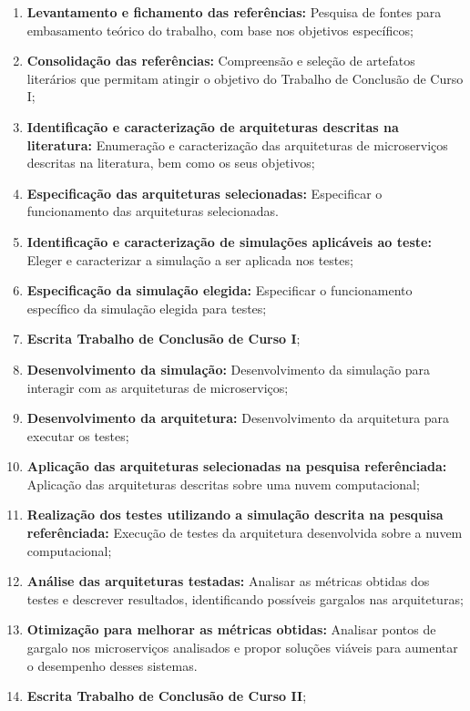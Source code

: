 \begin{enumerate}
  \item \textbf{Levantamento e fichamento das referências:} Pesquisa de fontes para embasamento teórico do trabalho, com base nos objetivos específicos;

  \item \textbf{Consolidação das referências:} Compreensão e seleção de artefatos literários que permitam atingir o objetivo do Trabalho de Conclusão de Curso I;

  \item \textbf{Identificação e caracterização de arquiteturas descritas na literatura:} Enumeração e caracterização das arquiteturas de microserviços descritas na literatura, bem como os seus objetivos;

  \item \textbf{Especificação das arquiteturas selecionadas:} Especificar o funcionamento das arquiteturas selecionadas.

  \item \textbf{Identificação e caracterização de simulações aplicáveis ao teste:} Eleger e caracterizar a simulação a ser aplicada nos testes;

  \item \textbf{Especificação da simulação elegida:} Especificar o funcionamento específico da simulação elegida para testes;

  \item \textbf{Escrita Trabalho de Conclusão de Curso I};

  \item \textbf{Desenvolvimento da simulação:} Desenvolvimento da simulação para interagir com as arquiteturas de microserviços;

  \item \textbf{Desenvolvimento da arquitetura:} Desenvolvimento da arquitetura para executar os testes;

  \item \textbf{Aplicação das arquiteturas selecionadas na pesquisa referênciada:} Aplicação das arquiteturas descritas sobre uma nuvem computacional;

  \item \textbf{Realização dos testes utilizando a simulação descrita na pesquisa referênciada:} Execução de testes da arquitetura desenvolvida sobre a nuvem computacional;

  \item \textbf{Análise das arquiteturas testadas:} Analisar as métricas obtidas dos testes e descrever resultados, identificando possíveis gargalos nas arquiteturas;

  \item \textbf{Otimização para melhorar as métricas obtidas:} Analisar pontos de gargalo nos microserviços analisados e propor soluções viáveis para aumentar o desempenho desses sistemas.

  \item \textbf{Escrita Trabalho de Conclusão de Curso II};
\end{enumerate}
